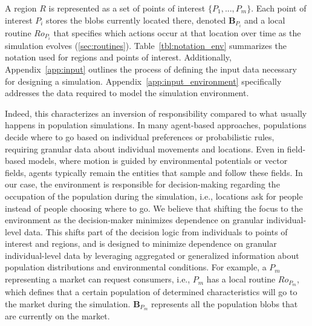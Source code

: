 \documentclass[pdflatex,sn-mathphys-num]{sn-jnl}%
\newcommand\redb[1]{#1}
\theoremstyle{thmstyleone}%
\theoremstyle{thmstyletwo}%
\theoremstyle{thmstylethree}%
\begin{document}
\redb{A region $R$ is represented as a set of points of interest $\{P_1, ..., P_m\}$. Each point of interest $P_i$ stores the blobs currently located there, denoted $\bm{B}_{P_i}$ and a local routine $Ro_{P_i}$
that specifies which actions occur at that location over time as the simulation evolves (\ref{sec:routines}). Table~\ref{tbl:notation_env} summarizes the notation used for regions and points of interest.} 
Additionally, Appendix~\ref{app:input} outlines the process of defining the input data necessary for designing a simulation. Appendix~\ref{app:input_environment} specifically addresses the data required to model the simulation environment.


Indeed, this characterizes an inversion of responsibility compared to what usually happens in population simulations. \redb{In many agent-based approaches, populations decide where to go based on individual preferences or probabilistic rules, requiring granular data about individual movements and locations. Even in field-based models, where motion is guided by environmental potentials or vector fields, agents typically remain the entities that sample and follow these fields.
In our case, the environment is responsible for decision-making regarding the occupation of the population during the simulation, i.e., locations ask for people instead of people choosing where to go. We believe that shifting the focus to the environment as the decision-maker minimizes dependence on granular individual-level data. This shifts part of the decision logic from individuals to points of interest and regions, and is designed to minimize dependence on granular individual-level data by leveraging aggregated or generalized information about population distributions and environmental conditions. }%
For example, a $P_m$ representing a market can request consumers, i.e., $P_m$ has a local routine $Ro_{P_m}$, which defines that a certain population of determined characteristics will go to the market during the simulation. $\bm{B}_{P_m}$ represents all the population blobs that are currently on the market.
\end{document}
